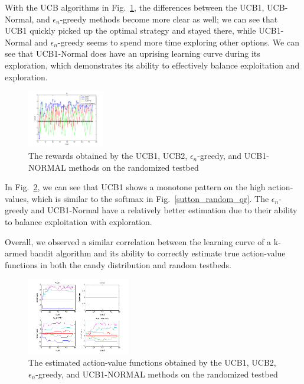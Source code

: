 \documentclass[conference]{IEEEtran}
\begin{document}
With the UCB algorithms in Fig.~\ref{ucb_random_r}, the differences between the UCB1, UCB-Normal, and $\epsilon_n$-greedy methods become more clear as well; we can see that UCB1 quickly picked up the optimal strategy and stayed there, while UCB1-Normal and $\epsilon_n$-greedy seems to spend more time exploring other options. We can see that UCB1-Normal does have an uprising learning curve during its exploration, which demonstrates its ability to effectively balance exploitation and exploration.

\begin{figure}
	\center	
	\includegraphics[width=0.3\textwidth]{fig/ucb_random_r.png}
	\caption{The rewards obtained by the UCB1, UCB2, $\epsilon_n$-greedy, and UCB1-NORMAL methods on the randomized testbed}
	\label{ucb_random_r}
\end{figure}

In Fig.~\ref{ucb_random_qr}, we can see that UCB1 shows a monotone pattern on the high action-values, which is similar to the softmax in Fig.~\ref{sutton_random_qr}. The $\epsilon_n$-greedy and UCB1-Normal have a relatively better estimation due to their ability to balance exploitation with exploration.

Overall, we observed a similar correlation between the learning curve of a k-armed bandit algorithm and its ability to correctly estimate true action-value functions in both the candy distribution and random testbeds.

\begin{figure}
	\center	
	\includegraphics[width=0.4\textwidth]{fig/ucb_random_qr.png}
	\caption{The estimated action-value functions obtained by the UCB1, UCB2, $\epsilon_n$-greedy, and UCB1-NORMAL methods on the randomized testbed}
	\label{ucb_random_qr}
\end{figure}
\end{document}
